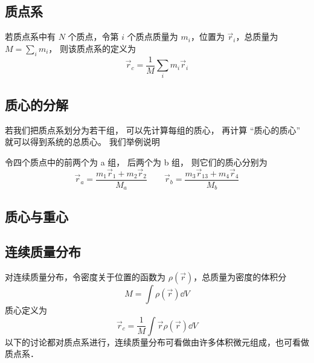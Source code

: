 \subsection{质点系}
若质点系中有 $N$ 个质点，令第 $i$ 个质点质量为 $m_i$，位置为 $\vec r_i$，总质量为 $M = \sum\limits_i m_i$， 则该质点系的定义为
\begin{equation}\label{CM_eq1}
\vec r_c = \frac{1}{M}\sum_i m_i \vec r_i
\end{equation}

\subsection{质心的分解}
若我们把质点系划分为若干组， 可以先计算每组的质心， 再计算 “质心的质心” 就可以得到系统的总质心。 我们举例说明
\begin{exam}{}
令四个质点中的前两个为 a 组， 后两个为 b 组， 则它们的质心分别为
\begin{equation}
\vec r_a = \frac{m_1 \vec r_1 + m_2 \vec r_2}{M_a}
\qquad
\vec r_b = \frac{m_3 \vec r_13+ m_4 \vec r_4}{M_b}
\end{equation}

\end{exam}

\subsection{质心与重心}


\subsection{连续质量分布}
对连续质量分布，令密度关于位置的函数为 $\rho (\vec r)$，总质量为密度的体积分 %
\begin{equation}
M = \int \rho (\vec r) \dd{V}
\end{equation}
质心定义为
\begin{equation}
\vec r_c = \frac{1}{M}\int \vec r\rho (\vec r) \dd{V}
\end{equation}
以下的讨论都对质点系进行，连续质量分布可看做由许多体积微元组成，也可看做质点系．

